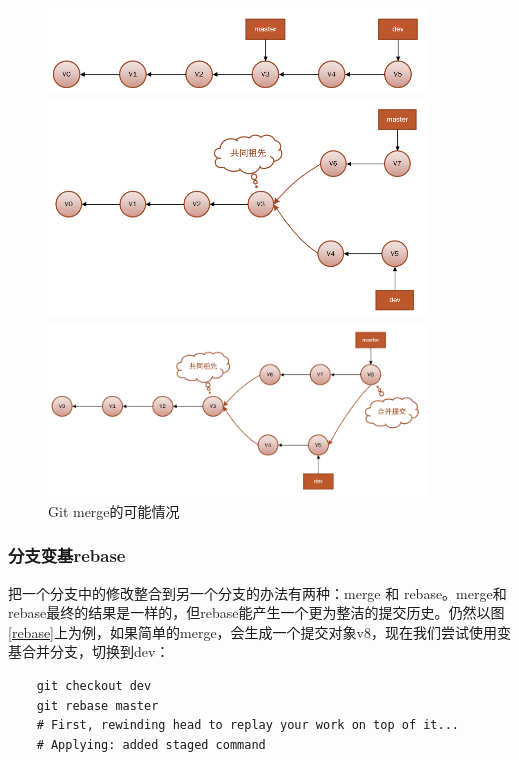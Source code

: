 \begin{figure}[ht]
    \centering
    \begin{minipage}[c]{0.9\textwidth}
        \centering
        \includegraphics[width=10cm]{image/git/giit-merge.png}
    \end{minipage}

    \begin{minipage}[c]{0.9\textwidth}
        \centering
        \includegraphics[width=10cm]{image/git/git-merge2.png}
    \end{minipage}

    \begin{minipage}[c]{0.9\textwidth}
        \centering
        \includegraphics[width=10cm]{image/git/git-merge3.png}
    \end{minipage}
    \caption{Git merge的可能情况}
    \label{merge}
\end{figure}

\subsubsection{分支变基rebase}
把一个分支中的修改整合到另一个分支的办法有两种：merge 和 rebase。merge和rebase最终的结果是一样的，但rebase能产生一个更为整洁的提交历史。仍然以图\ref{rebase}上为例，如果简单的merge，会生成一个提交对象v8，现在我们尝试使用变基合并分支，切换到dev：
\begin{lstlisting}
    git checkout dev
    git rebase master
    # First, rewinding head to replay your work on top of it...
    # Applying: added staged command
\end{lstlisting}


